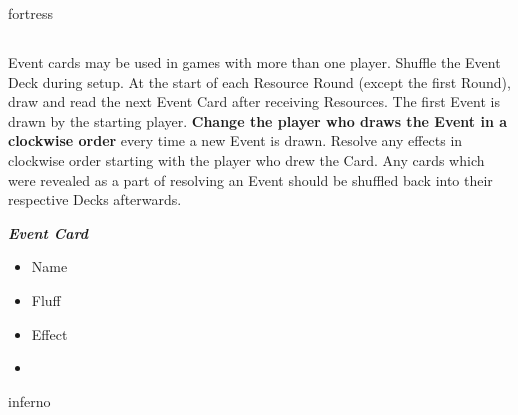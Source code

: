 \begin{multicols*}{2}
\vspace*{\fill}
\columnbreak
\begin{expansion}{fortress}
  \subsection*{}
  Event cards may be used in games with more than one player.
  Shuffle the Event Deck during setup.
  At the start of each Resource Round (except the first Round), draw and read the next Event Card after receiving Resources.
  The first Event is drawn by the starting player.
  \textbf{Change the player who draws the Event in a clockwise order} every time a new Event is drawn.
  Resolve any effects in clockwise order starting with the player who drew the Card.
  Any cards which were revealed as a part of resolving an Event should be shuffled back into their respective Decks afterwards.

  \medskip

  \begin{minipage}[h]{\linewidth}
    \vspace{0.1pt}
    \centering
    \begin{scriptsize}
    \end{scriptsize}
    \footnotesize
    \textbf{\textit{\textcolor{darkcandyapplered}{Event Card}}}
    \begin{multicols}{2}
      \begin{itemize}
        \item[\textbf{1.}] Name
        \item[\textbf{2.}] Fluff
        \item[\textbf{3.}] Effect
        \item[\textbf{\phantom{.}}] \phantom{.}
      \end{itemize}
    \end{multicols}
  \end{minipage}
\end{expansion}

\begin{expansion}{inferno}

\end{expansion}
\end{multicols*}
